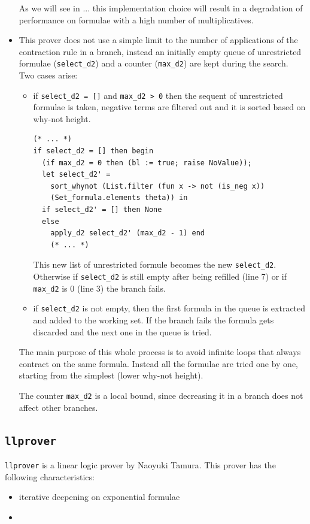 \documentclass[a4paper, 12pt, tesi, english]{report}
\begin{document}
\begin{itemize}
		As we will see in ... %
		this implementation choice will result in a degradation of performance on formulae with a high number of multiplicatives.
	\item This prover does not use a simple limit to the number of applications of the contraction rule in a branch, instead an initially empty queue of unrestricted formulae (\texttt{select\_d2}) and a counter (\texttt{max\_d2}) are kept during the search.
		Two cases arise:
		\begin{itemize}
			\item if \texttt{select\_d2 = []} and \texttt{max\_d2 > 0} then the sequent of unrestricted formulae is taken, negative terms are filtered out and it is sorted based on why-not height.	%
				\begin{lstlisting}[language=caml]
(* ... *)
if select_d2 = [] then begin
  (if max_d2 = 0 then (bl := true; raise NoValue));                    
  let select_d2' = 
    sort_whynot (List.filter (fun x -> not (is_neg x)) 
    (Set_formula.elements theta)) in
  if select_d2' = [] then None
  else
    apply_d2 select_d2' (max_d2 - 1) end
    (* ... *)
				\end{lstlisting}
				This new list of unrestricted formule becomes the new \texttt{select\_d2}.
				Otherwise if \texttt{select\_d2} is still empty after being refilled (line 7) or if \texttt{max\_d2} is 0 (line 3) the branch fails.
			\item if \texttt{select\_d2} is not empty, then the first formula in the queue is extracted and added to the working set.	%
				If the branch fails the formula gets discarded and the next one in the queue is tried.	%
		\end{itemize}
		The main purpose of this whole process is to avoid infinite loops that always contract on the same formula.
		Instead all the formulae are tried one by one, starting from the simplest (lower why-not height).

		The counter \texttt{max\_d2} is a local bound, since decreasing it in a branch does not affect other branches.
\end{itemize}

\subsection{\texttt{llprover}}
\texttt{llprover} is a linear logic prover by Naoyuki Tamura.
This prover has the following characteristics:
\begin{itemize}
	\item iterative deepening on exponential formulae
	\item 
\end{itemize}
\end{document}
